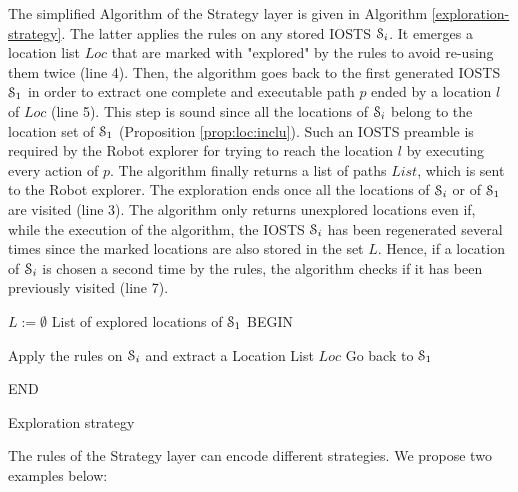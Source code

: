 The simplified Algorithm of the Strategy layer is given in
Algorithm \ref{exploration-strategy}. The latter applies the
rules on any stored IOSTS $\EuScript{S}_i$. It emerges a
location list $Loc$ that are marked with "explored" by the rules
to avoid re-using them twice (line 4). Then, the algorithm goes
back to the first generated IOSTS $\EuScript{S}_1$ in order to
extract one complete and executable path $p$ ended by a location
$l$ of $Loc$ (line 5). This step is sound since all the locations
of $\EuScript{S}_i$ belong to the location set of
$\EuScript{S}_1$ (Proposition \ref{prop:loc:inclu}). Such an
IOSTS preamble is required by the Robot explorer for trying to
reach the location $l$ by executing every action of $p$. The
algorithm finally returns a list of paths $List$, which is sent
to the Robot explorer. The exploration ends once all the
locations of $\EuScript{S}_i$ or of $\EuScript{S}_1$ are visited
(line 3). The algorithm only returns unexplored locations even
if, while the execution of the algorithm, the IOSTS
$\EuScript{S}_i$ has been regenerated several times since the
marked locations are also stored in the set $L$. Hence, if a
location of $\EuScript{S}_i$ is chosen a second time by the
rules, the algorithm checks if it has been previously visited
(line 7).

\begin{algorithm}
 


$L:=\emptyset$ List of explored locations of $\EuScript{S}_1$\;
BEGIN\;
{
Apply the rules on $\EuScript{S}_i$ and extract a  Location List $Loc$\;
Go back to $\EuScript{S}_1$\;

}
END\;

\caption{Exploration strategy}
\label{exploration-strategy}
\end{algorithm}

The rules of the Strategy layer can encode different strategies.
We propose two examples below:

